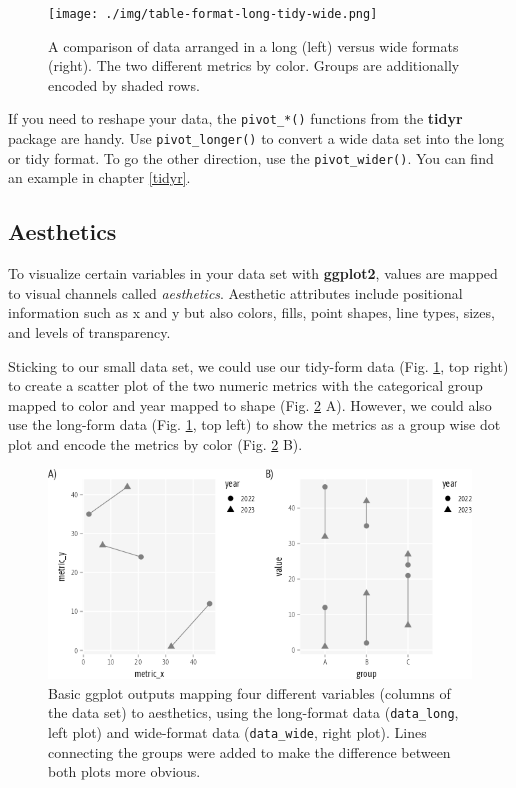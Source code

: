 \documentclass[
]{krantz}
\begin{document}
\begin{figure}
\centering
\texttt{[image: ./img/table-format-long-tidy-wide.png]}
\caption{\label{fig:02imgFormatLongTidyWide}A comparison of data arranged in a long (left) versus wide formats (right). The two different metrics by color. Groups are additionally encoded by shaded rows.}
\end{figure}

If you need to reshape your data, the \texttt{pivot\_*()} functions from the \textbf{tidyr} package are handy. Use \texttt{pivot\_longer()} to convert a wide data set into the long or tidy format. To go the other direction, use the \texttt{pivot\_wider()}. You can find an example in chapter \ref{tidyr}.

\hypertarget{aesthetics}{%
\subsection{Aesthetics}\label{aesthetics}}

To visualize certain variables in your data set with \textbf{ggplot2}, values are mapped to visual channels called \emph{aesthetics}. Aesthetic attributes include positional information such as x and y but also colors, fills, point shapes, line types, sizes, and levels of transparency.

Sticking to our small data set, we could use our tidy-form data (Fig. \ref{fig:02imgFormatLongTidyWide}, top right) to create a scatter plot of the two numeric metrics with the categorical group mapped to color and year mapped to shape (Fig. \ref{fig:02ggplotAestheticsData} A). However, we could also use the long-form data (Fig. \ref{fig:02imgFormatLongTidyWide}, top left) to show the metrics as a group wise dot plot and encode the metrics by color (Fig. \ref{fig:02ggplotAestheticsData} B).

\begin{figure}
\centering
\includegraphics{bookdown_files/figure-latex/02ggplotAestheticsData-1.png}
\caption{\label{fig:02ggplotAestheticsData}Basic ggplot outputs mapping four different variables (columns of the data set) to aesthetics, using the long-format data (\texttt{data\_long}, left plot) and wide-format data (\texttt{data\_wide}, right plot). Lines connecting the groups were added to make the difference between both plots more obvious.}
\end{figure}
\end{document}
